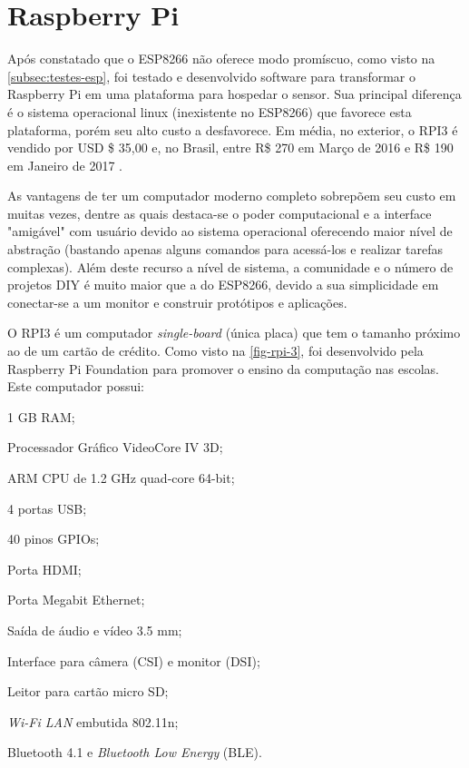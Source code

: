 \section{Raspberry Pi}
\label{sec:Raspberry-Pi}

Após constatado que o ESP8266 não oferece modo promíscuo, como visto na
\autoref{subsec:testes-esp}, foi testado e desenvolvido software para
transformar o Raspberry Pi em uma plataforma para hospedar o sensor. Sua
principal diferença é o sistema operacional linux (inexistente no ESP8266) que
favorece esta plataforma, porém seu alto custo a desfavorece. Em média, no
exterior, o RPI3 é vendido por USD \$ 35,00 \cite{RPI2016} e, no Brasil, entre
R\$ 270 em Março de 2016 e R\$ 190 em Janeiro de 2017 \cite{rpi3-mercadolivre}.

As vantagens de ter um computador moderno completo sobrepõem seu custo em muitas
vezes, dentre as quais destaca-se o poder computacional e a interface "amigável"
com usuário devido ao
sistema operacional oferecendo maior nível de abstração (bastando apenas alguns
comandos para acessá-los e realizar tarefas complexas).
Além deste recurso a nível de sistema, a comunidade e o número de projetos DIY
é muito maior que a do ESP8266, devido a sua simplicidade em
conectar-se a um monitor e construir protótipos e aplicações.

O RPI3 é um computador \emph{single-board}  (única placa) que tem o tamanho
próximo ao de um cartão de crédito. Como visto na \autoref{fig-rpi-3}, foi
desenvolvido pela Raspberry Pi Foundation para promover o ensino da computação
nas escolas. Este computador possui:


\begin{alineas}
	\item 1 GB RAM;

	\item Processador Gráfico VideoCore IV 3D;

	\item ARM CPU de 1.2 GHz quad-core 64-bit;

	\item 4 portas USB;

	\item 40 pinos GPIOs;

	\item Porta HDMI;

	\item Porta Megabit Ethernet;

	\item Saída de áudio e vídeo 3.5 mm;

	\item Interface para câmera (CSI) e monitor (DSI);

	\item Leitor para cartão micro SD;

	\item \emph{Wi-Fi LAN} embutida 802.11n;

	\item Bluetooth 4.1 e \emph{Bluetooth Low Energy} (BLE).

\end{alineas}

